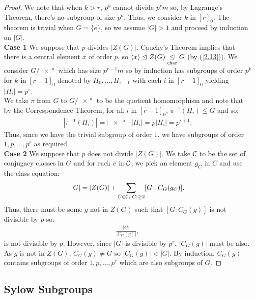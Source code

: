 \begin{proof}
    We note that when $k > r$, $p^k$ cannot divide $p^rm$
    so, by Lagrange's Theorem, there's no subgroup
    of size $p^k$. Thus, we consider $k$ in $[r]_0$.
    The theorem is trivial when $G = \{e\}$, so we assume $|G| > 1$
    and proceed by induction on $|G|$.
    \\[\baselineskip]
    \textbf{Case 1} We suppose that $p$ divides $|Z(G)|$.
    Cauchy's Theorem implies that there is a central element
    $x$ of order $p$, so ${\langle x \rangle} \trianglelefteq Z(G) \underset{\text{char}}{\trianglelefteq} G$ (by (\ref{2.13})). We consider
    $G / \ang{x}$ which has size $p^{r - 1}m$ so by induction
    has subgroups of order $p^k$ for $k$ in $[r - 1]_0$
    denoted by $H_0, \ldots, H_{r - 1}$ with each $i$
    in $[r - 1]_0$ yielding $|H_i| = p^i$.
    \\[\baselineskip]
    We take $\pi$ from $G$ to $G / \ang{x}$ to be the
    quotient homomorphism and note that by the Correspondence 
    Theorem, for all $i$ in $[r - 1]_0$, $\pi^{-1}(H_i) \leq G$ and so:
    \begin{align*}
        |\pi^{-1}(H_i)| = |\ang{x}| \cdot |H_i| = p|H_i| = p^{i + 1}.
    \end{align*} Thus, since we have the trivial subgroup of order
    $1$, we have subgroups of order $1, p, \ldots, p^r$ as
    required.
    \\[\baselineskip]
    \textbf{Case 2} We suppose that $p$ does not divide $|Z(G)|$.
    We take $\mathcal{C}$ to be the set of conjugacy classes in $G$
    and for each $c$ in $\mathcal{C}$, we pick an element $g_C$ in $C$
    and use the class equation: \begin{align*}
        |G| = |Z(G)| + \sum_{C \in \mathcal{C}, |C| \geq 2} [G : C_G(g_C)].
    \end{align*}
    Thus, there must be some $g$ not in $Z(G)$ such that
    $[G : C_G(g)]$ is not divisible by $p$ so: \begin{align*}
        \frac{|G|}{|C_G(g)|},
    \end{align*} is not divisible by $p$. However, since
    $|G|$ is divisible by $p^r$, $|C_G(g)|$ must be also.
    As $g$ is not in $Z(G)$, $C_G(g) \neq G$ so 
    $|C_G(g)| < |G|$. By induction, $C_G(g)$ contains
    subgroups of order $1, p, \ldots, p^r$ which are
    also subgroups of $G$.
\end{proof}

\subsection{Sylow Subgroups}


